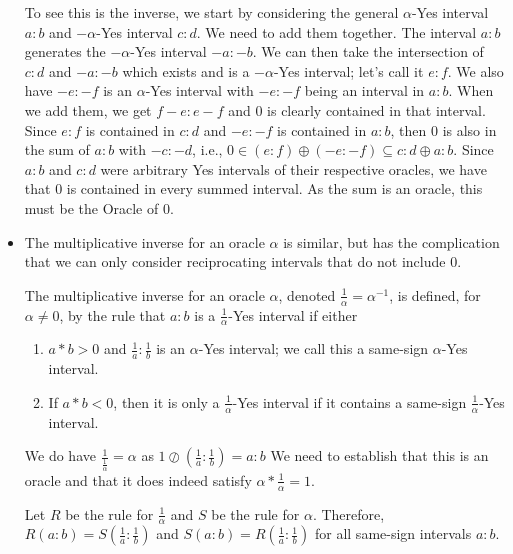 \documentclass[12pt]{article}
\begin{document}
\begin{itemize}
    To see this is the inverse, we start by considering the general $\alpha$-Yes interval $a:b$ and $-\alpha$-Yes interval $c:d$. We need to add them together. The interval $a:b$ generates the $-\alpha$-Yes interval $-a:-b$. We can then take the intersection of $c:d$ and $-a:-b$ which exists and is a $-\alpha$-Yes interval; let's call it $e:f$. We also have $-e:-f$ is an $\alpha$-Yes interval with $-e:-f$ being an interval in $a:b$. When we add them, we get $f-e:e-f$ and $0$ is clearly contained in that interval. Since $e:f$ is contained in $c:d$ and $-e:-f$ is contained in $a:b$, then $0$ is also in the sum of $a:b$ with $-c:-d$, i.e.,  $0 \in (e:f) \oplus (-e:-f) \subseteq c:d \oplus a:b$. Since $a:b$ and $c:d$ were arbitrary Yes intervals of their respective oracles, we have that 0 is contained in every summed interval. As the sum is an oracle, this must be the Oracle of $0$.
    
    \item The multiplicative inverse for an oracle $\alpha$ is similar, but has the complication that we can only consider reciprocating intervals that do not include 0. 
    
    The multiplicative inverse for an oracle $\alpha$, denoted $\frac{1}{\alpha} = \alpha^{-1}$, is defined, for $\alpha \neq 0$, by the rule that $a:b$ is a $\frac{1}{\alpha}$-Yes interval if either 
    
    \begin{enumerate}
        \item  $a*b > 0$  and $\frac{1}{a}:\frac{1}{b}$ is an $\alpha$-Yes interval; we call this a same-sign $\alpha$-Yes interval.
        \item If $a*b<0$, then it is only a $\frac{1}{\alpha}$-Yes interval if it contains a same-sign $\frac{1}{\alpha}$-Yes interval. 
    \end{enumerate}
    
    We do have $\frac{1}{\frac{1}{\alpha}} = \alpha$ as $1\oslash (\frac{1}{a}: \frac{1}{b}) = a:b$ We need to establish that this is an oracle and that it does indeed satisfy $\alpha * \frac{1}{\alpha} = 1$.
    
     Let $R$ be the rule for $\frac{1}{\alpha}$ and $S$ be the rule for $\alpha$. Therefore, $R(a:b)=S(\frac{1}{a}:\frac{1}{b})$ and $S(a:b) = R(\frac{1}{a}:\frac{1}{b})$ for all same-sign intervals $a:b$.
    

\end{itemize}
\end{document}
